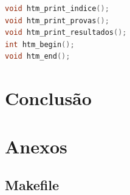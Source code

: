 \documentclass[11pt, a4paper, oneside]{article}
\begin{document}
\begin{lstlisting}[language=C, caption={Assinatura das funções.}]
void htm_print_indice();
void htm_print_provas();
void htm_print_resultados();
int htm_begin();
void htm_end();
\end{lstlisting}

\newpage
\section{Conclusão}

\newpage
\section{Anexos}

\subsection{Makefile}
\end{document}
